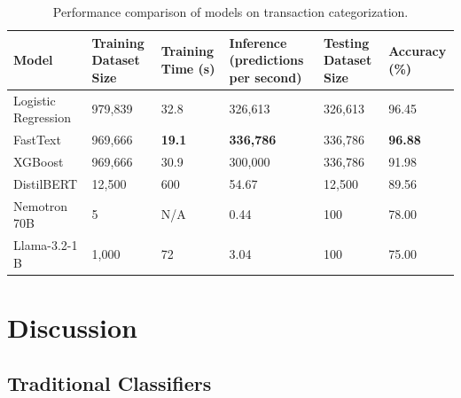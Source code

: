 \documentclass[12pt,letterpaper]{article}
\begin{document}
\begin{table}[h!]
\centering
\begin{tabular}{|l|p{2.5cm}|p{1.7cm}|p{3.5cm}|p{2.5cm}|p{1.7cm}|}
\hline
\textbf{Model}           & \textbf{Training Dataset Size} & \textbf{Training Time (s)} & \textbf{Inference (predictions per second)} & \textbf{Testing Dataset Size} & \textbf{Accuracy (\%)} \\ \hline
Logistic Regression      & 979,839                        & 32.8                       & 326,613                                     & 326,613                      & 96.45                 \\ \hline
FastText                 & 969,666                        & \textbf{19.1}                       & \textbf{336,786}                                     & 336,786                      & \textbf{96.88}                 \\ \hline
XGBoost                  & 969,666                        & 30.9                       & 300,000                                     & 336,786                      & 91.98                 \\ \hline
DistilBERT               & 12,500                         & 600                       & 54.67                                       & 12,500                       & 89.56                 \\ \hline
Nemotron 70B             & 5                              & N/A                        & 0.44                                        & 100                          & 78.00                    \\ \hline
Llama-3.2-1 B            & 1,000                          & 72                         & 3.04                                        & 100                          & 75.00                    \\ \hline
\end{tabular}
\caption{Performance comparison of models on transaction categorization.}
\label{tab:model_comparison}
\end{table}





\section{Discussion}
\subsection{Traditional Classifiers}
\end{document}
